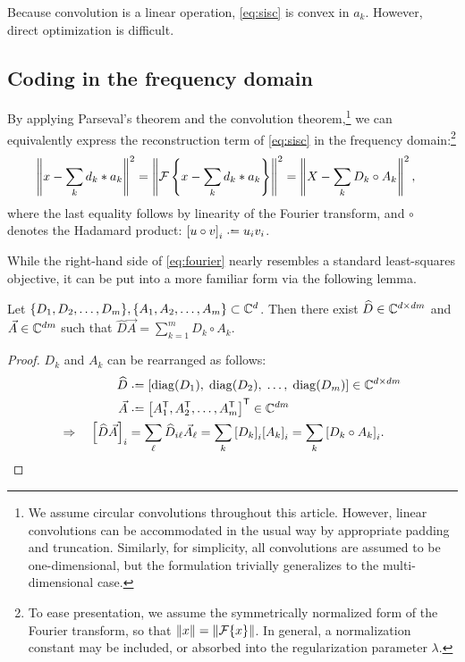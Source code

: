 \documentclass{article} %
\begin{document}
Because convolution is a linear operation, \eqref{eq:sisc} is convex in $a_k$.  
However, direct optimization is difficult.

\subsection{Coding in the frequency domain}
By applying Parseval's theorem and the convolution theorem,\footnote{We assume circular
convolutions throughout this article. However, linear convolutions can be accommodated
in the usual way by appropriate padding and truncation. Similarly, for simplicity, all 
convolutions are assumed to be one-dimensional, but the formulation trivially
generalizes to the multi-dimensional case.} we can equivalently express the 
reconstruction term of \eqref{eq:sisc} in the frequency domain:\footnote{To ease
presentation, we assume the symmetrically normalized form of the Fourier transform, 
so that $\|x\| = \|\mathcal{F}\{x\}\|$. In general, a normalization constant may be included, 
or absorbed into the regularization parameter $\lambda$.}
\begin{align}
\left\|x - \sum_k d_k * a_k\right\|^2 &= \left\|\mathcal{F}\left\{x - \sum_k d_k *
a_k\right\}\right\|^2
= \left\| X - \sum_k D_k \circ A_k\right\|^2,\label{eq:fourier}
\end{align}
where the last equality follows by linearity of the Fourier transform, and $\circ$
denotes the Hadamard product: ${[u\circ v]}_i \defeq u_i v_i$.

While the right-hand side of \eqref{eq:fourier} nearly resembles a standard
least-squares objective, it can be put into a more familiar form via the following
lemma.
\begin{lemma}
Let $\{D_1, D_2, \dots, D_m\}, \{A_1, A_2, \dots, A_m\} \subset \mathbb{C}^d$.  
Then there exist ${\widehat{D} \in \mathbb{C}^{d\times dm}}$ and ${\vec{A} \in \mathbb{C}^{dm}}$ such that 
${\widehat{D}\vec{A} = \sum_{k=1}^m D_k \circ A_k}$.\label{lemma:hadamard}
\end{lemma}
\begin{proof}
$D_k$ and $A_k$ can be rearranged as follows:
\begin{align*}
\widehat{D} &\defeq \left[\diag(D_1),\; \diag(D_2),\; \dots,\; \diag(D_m)\right] \in \C^{d\times dm}\\
\vec{A} &\defeq \left[A_1\trans, A_2\trans, \dots,
A_m\trans\right]\trans \in \C^{dm}\\
\Rightarrow \quad {\left[\widehat{D}\vec{A}\right]}_i &= \sum_\ell \widehat{D}_{i\ell}
\vec{A}_\ell = \sum_k {[D_k]}_i {[A_k]}_i = \sum_k
{[D_k \circ A_k]}_i.
\end{align*}
\end{proof}
\end{document}
